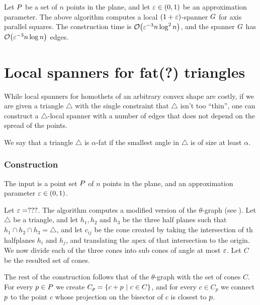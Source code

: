 \documentclass[12pt]{article}%
\begin{document}
\begin{theorem}
    Let $P$ be a set of $n$ points in the plane, and let
    $\varepsilon \in (0,1)$ be an approximation parameter. The above
    algorithm computes a local $(1+\varepsilon)$-spanner $G$ for axis
    parallel squares.  The construction time is
    $\Of\pth{\eps^{-3} n \log^2 n}$, and the spanner $G$ has
    $\Of\pth{\eps^{-3} n \log n}$ edges.
\end{theorem}




\section{Local spanners for fat(?) triangles}

While local spanners for homothets of an arbitrary convex shape are costly,
if we are given a triangle $\triangle$ with the single constraint that $\triangle$
isn't too ``thin'', one can construct a $\triangle$-local spanner with a number of
edges that does not depend on the spread of the points.

\begin{defn}
	We say that a triangle $\triangle$ is $\alpha$-fat if the smallest angle in $\triangle$ is of size at least $\alpha$.
\end{defn}

\subsubsection{Construction}

The input is a point set $P$ of $n$ points in the plane, and an
approximation parameter $\varepsilon \in (0,1)$.

Let $\varepsilon = ???$.  The algorithm computes a modified version of the $\theta$-graph (see \cite{c-aaspmp-87}). Let $\triangle$ be a triangle, and let $h_1,h_2$ and $h_3$ be the three half planes such that $h_1\cap h_2\cap h_3 = \triangle$, and let $c_{ij}$ be the cone created by taking the intersection of th halfplanes $h_i$ and $h_j$, and translating the apex of that intersection to the origin. We now divide each of the three cones into sub cones of angle at most $\varepsilon$. Let $C$ be the resulted set of cones.

The rest of the construction follows that of the $\theta$-graph with the set of cones $C$. For every $p\in P$ we create $C_p = \{c+p ~|~ c\in C\}$, and for every $c\in C_p$ we connect $p$ to the point $c$ whose projection on the bisector of $c$ is closest to $p$. 
\end{document}
